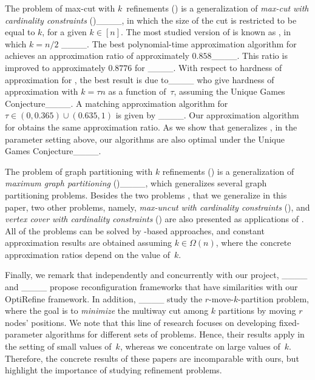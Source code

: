 The problem of max-cut with $k$~refinements (\maxcutkc) is a generalization of \emph{max-cut with cardinality constraints} ({\ccmaxcut})____, in which the size of the cut is restricted to be equal to $k$, for a given $k \in [n]$.
The most studied version of {\ccmaxcut} is known as \maxbis, in which $k=n/2$
____. 
The best polynomial-time approximation algorithm for {\ccmaxcut} achieves an approximation ratio of approximately $0.858$____.
This ratio is improved to approximately $0.8776$ for \maxbis 
____.
With respect to hardness of approximation for {\ccmaxcut}, the best result is due to____ who give hardness of approximation with $k=\tau n$  as a function of~$\tau$, assuming the Unique Games Conjecture____.
A matching approximation algorithm for $\tau \in (0,0.365) \cup (0.635,1)$ is given by ____.
Our approximation algorithm for \maxcutkc obtains the same approximation ratio. As we show that \maxcutkc generalizes \ccmaxcut, in the parameter setting above, our algorithms are also optimal under the Unique Games Conjecture____.

The problem of graph partitioning with $k$ refinements (\gpkc) is a
generalization of \emph{maximum graph partitioning}
(\maxgp)____, which generalizes several graph partitioning
	problems.
Besides the two problems \dks, \ccmaxcut that we generalize in this paper, two
other problems, namely, \emph{max-uncut with cardinality constraints} (\ccmaxuncut),
	  and \emph{vertex cover with cardinality constraints} (\ccvc) are also presented
	  as applications of \maxgp. 
All of the problems can be solved by \sdp-based approaches, and constant
approximation results are obtained assuming $k \in \Omega(n)$, where the
concrete approximation ratios depend on the value of~$k$. 

Finally, we remark that independently and concurrently with our project, ____ and ____ propose reconfiguration frameworks that have similarities with our OptiRefine framework.
In addition, ____ study the $r$-move-$k$-partition problem, where the goal is to \emph{minimize} the multi\-way cut among $k$ partitions by moving $r$ nodes' positions. 
We note that this line of research focuses on developing fixed-parameter
algorithms for different sets of problems. Hence, their results apply in the
setting of small values of~$k$, whereas we concentrate on large values of~$k$.
Therefore, the concrete results of these papers are incomparable with ours, but
highlight the importance of studying refinement problems.

